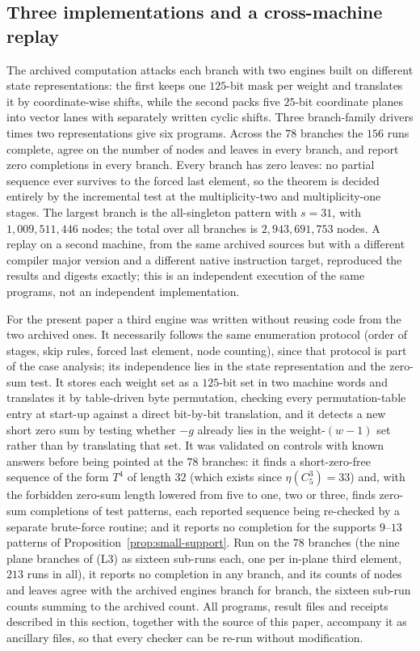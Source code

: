 \documentclass[11pt]{article}
\theoremstyle{definition}
\theoremstyle{remark}
\newcommand{\C}{C_5^{3}}
\begin{document}
\subsection{Three implementations and a cross-machine replay}\label{subsec:engines}

The archived computation attacks each branch with two engines built on different state representations: the first keeps one $125$-bit mask per weight and translates it by coordinate-wise shifts, while the second packs five $25$-bit coordinate planes into vector lanes with separately written cyclic shifts. Three branch-family drivers times two representations give six programs. Across the $78$ branches the $156$ runs complete, agree on the number of nodes and leaves in every branch, and report zero completions in every branch. Every branch has zero leaves: no partial sequence ever survives to the forced last element, so the theorem is decided entirely by the incremental test at the multiplicity-two and multiplicity-one stages. The largest branch is the all-singleton pattern with $s=31$, with $1{,}009{,}511{,}446$ nodes; the total over all branches is $2{,}943{,}691{,}753$ nodes. A replay on a second machine, from the same archived sources but with a different compiler major version and a different native instruction target, reproduced the results and digests exactly; this is an independent execution of the same programs, not an independent implementation.

For the present paper a third engine was written without reusing code from the two archived ones. It necessarily follows the same enumeration protocol (order of stages, skip rules, forced last element, node counting), since that protocol is part of the case analysis; its independence lies in the state representation and the zero-sum test. It stores each weight set as a $125$-bit set in two machine words and translates it by table-driven byte permutation, checking every permutation-table entry at start-up against a direct bit-by-bit translation, and it detects a new short zero sum by testing whether $-g$ already lies in the weight-$(w-1)$ set rather than by translating that set. It was validated on controls with known answers before being pointed at the $78$ branches: it finds a short-zero-free sequence of the form $T^4$ of length $32$ (which exists since $\eta(\C)=33$) and, with the forbidden zero-sum length lowered from five to one, two or three, finds zero-sum completions of test patterns, each reported sequence being re-checked by a separate brute-force routine; and it reports no completion for the supports $9$--$13$ patterns of Proposition~\ref{prop:small-support}. Run on the $78$ branches (the nine plane branches of (L3) as sixteen sub-runs each, one per in-plane third element, $213$ runs in all), it reports no completion in any branch, and its counts of nodes and leaves agree with the archived engines branch for branch, the sixteen sub-run counts summing to the archived count. All programs, result files and receipts described in this section, together with the source of this paper, accompany it as ancillary files, so that every checker can be re-run without modification.
\end{document}
